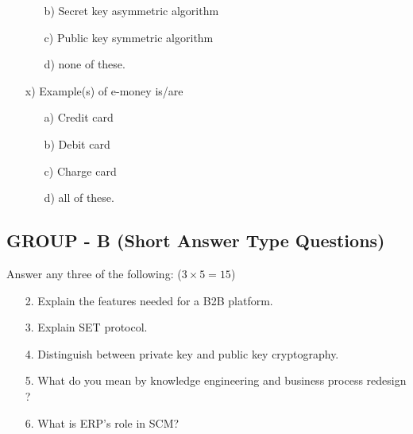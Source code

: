 \documentclass{article}
\begin{document}
\begin{enumerate}
\begin{enumerate}
        \item[b)] Secret key asymmetric algorithm
        \item[c)] Public key symmetric algorithm
        \item[d)] none of these.
    \end{enumerate}
    \item[x)] Example(s) of e-money is/are
    \begin{enumerate}
        \item[a)] Credit card
        \item[b)] Debit card
        \item[c)] Charge card
        \item[d)] all of these.
    \end{enumerate}
\end{enumerate}

\subsection*{GROUP - B (Short Answer Type Questions)}
Answer any three of the following: ($3 \times 5 = 15$)
\begin{enumerate}
    \item[2.] Explain the features needed for a B2B platform.
    \item[3.] Explain SET protocol.
    \item[4.] Distinguish between private key and public key cryptography.
    \item[5.] What do you mean by knowledge engineering and business process redesign ?
    \item[6.] What is ERP's role in SCM?
\end{enumerate}
\end{document}
